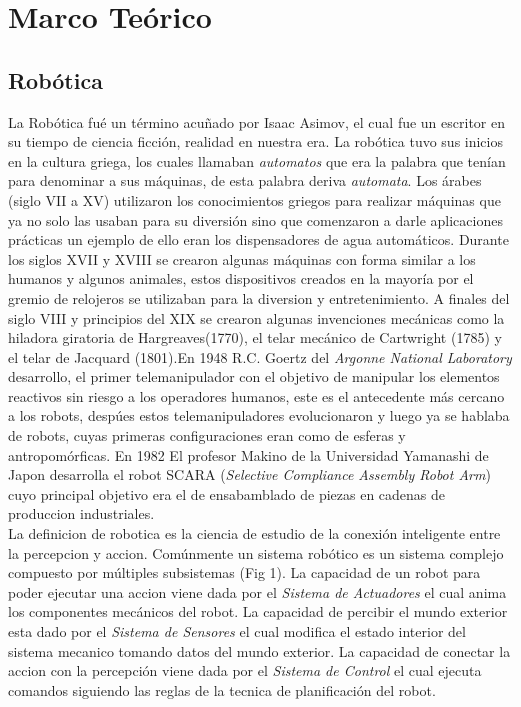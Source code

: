 \documentclass[conference]{IEEEtran}
\begin{document}
\section{Marco Te\'orico}
\subsection{Rob\'otica}
La Rob\'otica fu\'e un t\'ermino acu\~nado por Isaac Asimov, el cual fue un escritor en su tiempo de ciencia ficci\'on, realidad en nuestra era. La rob\'otica tuvo sus inicios en la cultura griega, los cuales llamaban \emph{automatos} que era la palabra que ten\'ian para denominar a sus m\'aquinas, de esta palabra deriva \emph{automata}. Los \'arabes (siglo VII a XV) utilizaron los conocimientos griegos para realizar m\'aquinas que ya no solo las usaban para su diversi\'on sino que comenzaron a darle aplicaciones pr\'acticas un ejemplo de ello eran los dispensadores de agua autom\'aticos. Durante los siglos XVII y XVIII  se crearon algunas m\'aquinas con forma similar a los humanos y algunos animales, estos dispositivos creados en la mayor\'ia por el gremio de relojeros se utilizaban para la diversion y entretenimiento. A finales del siglo VIII y principios del XIX se crearon algunas invenciones mec\'anicas como la hiladora giratoria de Hargreaves(1770), el telar mec\'anico de Cartwright (1785) y el telar de Jacquard (1801).En 1948 R.C. Goertz del \emph{Argonne National Laboratory} desarrollo, el primer telemanipulador con el objetivo de manipular los elementos reactivos sin riesgo a los operadores humanos, este es el antecedente m\'as cercano a los robots, desp\'ues estos telemanipuladores evolucionaron y luego ya se hablaba de robots, cuyas primeras configuraciones eran como de esferas y antropom\'orficas. En 1982 El profesor Makino de la Universidad Yamanashi de Japon desarrolla el robot SCARA (\emph{Selective Compliance Assembly Robot Arm}) cuyo principal objetivo era el de ensabamblado de piezas en cadenas de produccion industriales. \cite{lib_rob1}\\
La definicion de robotica es la ciencia de estudio de la conexi\'on inteligente entre la percepcion y accion. Com\'unmente un sistema rob\'otico es un sistema complejo compuesto por m\'ultiples subsistemas (Fig 1). La capacidad de un robot para poder ejecutar una accion viene dada por el \textit{Sistema de Actuadores} el cual anima los componentes mec\'anicos del robot. La capacidad de percibir el mundo exterior esta dado por el \textit{Sistema de Sensores} el cual modifica el estado interior del sistema mecanico tomando datos del mundo exterior. La capacidad de conectar la accion con la percepci\'on viene dada por el \textit{Sistema de Control} el cual ejecuta comandos siguiendo las reglas de la tecnica de planificaci\'on del robot.\cite{lib_rob2}
\end{document}
